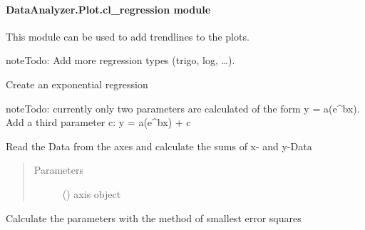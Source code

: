 \documentclass[letterpaper,10pt,english]{sphinxmanual}
\begin{document}
\paragraph{DataAnalyzer.Plot.cl\_regression module}
\label{\detokenize{DataAnalyzer.Plot:module-DataAnalyzer.Plot.cl_regression}}\label{\detokenize{DataAnalyzer.Plot:dataanalyzer-plot-cl-regression-module}}
This module can be used to add trendlines to the plots.

\begin{sphinxadmonition}{note}{\label{DataAnalyzer.Plot:index-0}Todo:}
Add more regression types (trigo, log, …).
\end{sphinxadmonition}

\begin{fulllineitems}
\label{\detokenize{DataAnalyzer.Plot:DataAnalyzer.Plot.cl_regression.Exponential}}
Create an exponential regression

\begin{sphinxadmonition}{note}{\label{DataAnalyzer.Plot:index-1}Todo:}
currently only two parameters are calculated of the form y = a(e\textasciicircum{}bx).
Add a third parameter c: y = a(e\textasciicircum{}bx) + c
\end{sphinxadmonition}

Read the Data from the axes and calculate the sums of x- and y-Data
\begin{quote}\begin{description}
\item[{Parameters}] \leavevmode
{} () \textendash{} axis object

\end{description}\end{quote}

\begin{fulllineitems}
\label{\detokenize{DataAnalyzer.Plot:DataAnalyzer.Plot.cl_regression.Exponential.fit}}
Calculate the parameters with the method of smallest error squares

\end{fulllineitems}


\end{fulllineitems}
\end{document}
